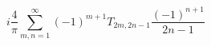 \begin{equation} i
\frac{4}{\pi}\sum_{m,n=1}^\infty (-1)^{m+1}T_{2m,2n-1}
\frac{(-1)^{n+1}}{2n-1}\label{eq:ambsum}\end{equation} 
